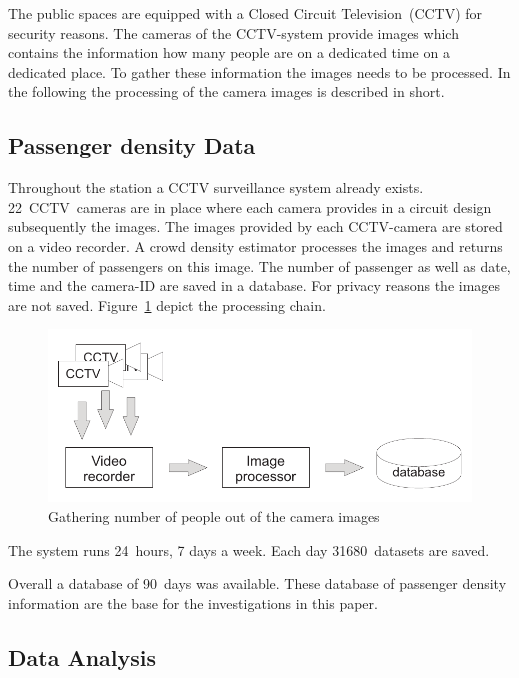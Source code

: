 The public spaces are equipped with a Closed Circuit Television~(CCTV) for security reasons. The cameras of the CCTV-system provide images which contains the information how many people are on a dedicated time on a dedicated place. To gather these information the images needs to be processed. In the following the processing of the camera images is described in short.


\subsection{Passenger density Data}
\label{subsec:PassengerDensityData}

Throughout the station a CCTV surveillance system already exists. 22~CCTV~cameras are in place where each camera provides in a circuit design subsequently the images. The images provided by each CCTV-camera are stored on a video recorder. A crowd density estimator processes the images and returns the number of passengers on this image. The number of passenger as well as date, time and the camera-ID are saved in a database. For privacy reasons the images are not saved. Figure~\ref{fig:CCTVimageProcessing} depict the processing chain.

\begin{figure}[htb]
  \centering
  \includegraphics[width=\linewidth]{imageProcessing.pdf} 
  \caption{Gathering number of people out of the camera images}
  \label{fig:CCTVimageProcessing}
\end{figure}

The system runs 24~hours, 7 days a week. Each day 31680~datasets are saved. 

Overall a database of 90~days was available.
These database of passenger density information are the base for the investigations in this paper.




\subsection{Data Analysis}
\label{subsec:dataAnalysis}

